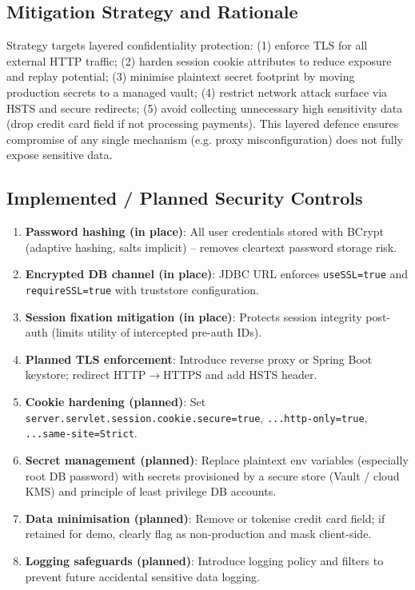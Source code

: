 \documentclass[]{UCD_CS_FYP_Report}
\begin{document}
\subsection*{Mitigation Strategy and Rationale}
Strategy targets layered confidentiality protection: (1) enforce TLS for all external HTTP traffic; (2) harden session cookie attributes to reduce exposure and replay potential; (3) minimise plaintext secret footprint by moving production secrets to a managed vault; (4) restrict network attack surface via HSTS and secure redirects; (5) avoid collecting unnecessary high sensitivity data (drop credit card field if not processing payments). This layered defence ensures compromise of any single mechanism (e.g. proxy misconfiguration) does not fully expose sensitive data.

\subsection*{Implemented / Planned Security Controls}
\begin{enumerate}
	\item \textbf{Password hashing (in place)}: All user credentials stored with BCrypt (adaptive hashing, salts implicit) -- removes cleartext password storage risk.
	\item \textbf{Encrypted DB channel (in place)}: JDBC URL enforces \texttt{useSSL=true} and \texttt{requireSSL=true} with truststore configuration.
	\item \textbf{Session fixation mitigation (in place)}: Protects session integrity post-auth (limits utility of intercepted pre-auth IDs).
	\item \textbf{Planned TLS enforcement}: Introduce reverse proxy or Spring Boot keystore; redirect HTTP\;$\rightarrow$\;HTTPS and add HSTS header.
	\item \textbf{Cookie hardening (planned)}: Set \texttt{server.servlet.session.cookie.secure=true}, \texttt{...http-only=true}, \texttt{...same-site=Strict}.
	\item \textbf{Secret management (planned)}: Replace plaintext env variables (especially root DB password) with secrets provisioned by a secure store (Vault / cloud KMS) and principle of least privilege DB accounts.
	\item \textbf{Data minimisation (planned)}: Remove or tokenise credit card field; if retained for demo, clearly flag as non-production and mask client-side.
	\item \textbf{Logging safeguards (planned)}: Introduce logging policy and filters to prevent future accidental sensitive data logging.
\end{enumerate}
\end{document}
